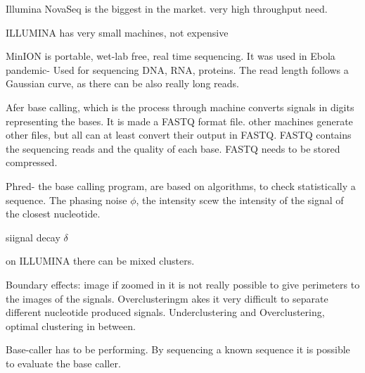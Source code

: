 Illumina NovaSeq is the biggest in the market. very high throughput need.


ILLUMINA has very small machines,  not expensive





MinION is portable, wet-lab free, real time sequencing. It was used in Ebola pandemic- Used for sequencing DNA, RNA, proteins. The read length follows a Gaussian curve, as there can be also really long reads.


Afer base calling, which is the process through machine converts signals in digits representing the bases. It is made a FASTQ format file. other machines generate other files, but all can at least convert their output in FASTQ. FASTQ contains the sequencing reads and the quality of each base. FASTQ needs to be stored compressed.

Phred- the base calling program, are based on algorithms, to check statistically a sequence.
The phasing noise $\phi$, the intensity scew the intensity of the signal of the closest nucleotide.

siignal decay $\delta$

on ILLUMINA there can be mixed clusters.

Boundary effects: image if zoomed in  it is not really possible to give perimeters to the images of the signals. Overclusteringm akes it very difficult to separate different nucleotide produced signals. Underclustering and Overclustering, optimal clustering in between.








Base-caller has to be performing. By sequencing a known sequence it is possible to evaluate the base caller.

